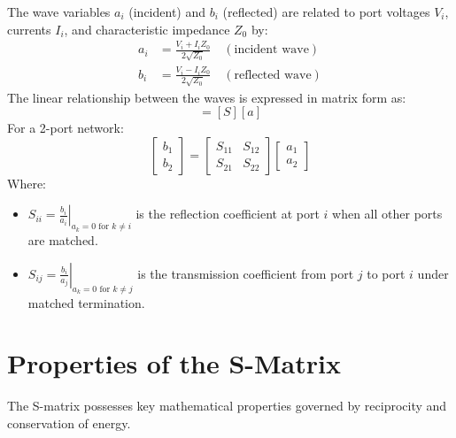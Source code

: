 \documentclass[12pt,a4paper]{article}
\begin{document}
\begin{tcolorbox}[formulabox, title={\textbf{Scattering Parameter Relations}}]
The wave variables $a_i$ (incident) and $b_i$ (reflected) are related to port voltages $V_i$, currents $I_i$, and characteristic impedance $Z_0$ by:
\begin{align}
  a_i &= \frac{V_i + I_i Z_0}{2\sqrt{Z_0}} \quad (\text{incident wave}) \\
  b_i &= \frac{V_i - I_i Z_0}{2\sqrt{Z_0}} \quad (\text{reflected wave})
\end{align}
The linear relationship between the waves is expressed in matrix form as:
\begin{equation}
  [b] = [S][a]
\end{equation}
For a 2-port network:
\begin{equation}
  \begin{bmatrix} b_1 \\ b_2 \end{bmatrix} = \begin{bmatrix} S_{11} & S_{12} \\ S_{21} & S_{22} \end{bmatrix} \begin{bmatrix} a_1 \\ a_2 \end{bmatrix}
\end{equation}
Where:
\begin{itemize}[leftmargin=1.5em, itemsep=1.5pt]
  \item[] $S_{ii} = \left. \frac{b_i}{a_i} \right|_{a_k=0 \text{ for } k \ne i}$ is the reflection coefficient at port $i$ when all other ports are matched.
  \item[] $S_{ij} = \left. \frac{b_i}{a_j} \right|_{a_k=0 \text{ for } k \ne j}$ is the transmission coefficient from port $j$ to port $i$ under matched termination.
\end{itemize}
\end{tcolorbox}

\section{Properties of the S-Matrix}

The S-matrix possesses key mathematical properties governed by reciprocity and conservation of energy.
\end{document}

